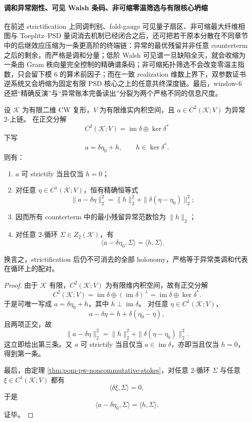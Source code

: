 \paragraph{调和异常刚性、可见 Walsh 条码、非可缩零温筛选与有限核心坍缩}
在前述 strictification 上同调判别、fold-gauge 可见量子扇区、非可缩最大纤维相图与 Toeplitz--PSD 量词消去机制已经闭合之后，还可把若干原本分散在不同章节中的后继效应压缩为一条更高阶的终端链：异常的最优残留并非任意 counterterm 之后的剩余，而严格是调和分量；低阶 Walsh 可见谱一旦缺陷全灭，就会收缩为一条由 Gram 秩向量完全控制的精确谱条码；非可缩拓扑筛选不会改变零温主指数，只会留下模 \(6\) 的算术前因子；而在一致 realization 维数上界下，双参数证书逆系统又会坍缩为固定有限 PSD 核心之上的任意共终深度链。最后，window-\(6\) 还把“精确反演”与“异常账本完备读出”分裂为两个严格不同的信息尺度。

\begin{theorem}\label{thm:conclusion-anomaly-harmonic-rigidity}
设 \(\mathcal K\) 为有限二维 CW 复形，\(V\) 为有限维实内积空间，且 \(a\in C^2(\mathcal K;V)\) 为异常 \(2\)-上链。
在正交分解
\[
C^2(\mathcal K;V)=\operatorname{im}\delta\oplus\ker\delta^\ast
\]
下写
\[
a=\delta\eta_0+h,
\qquad
h\in\ker\delta^\ast.
\]
则有：
\begin{enumerate}
  \item \(a\) 可 strictify 当且仅当 \(h=0\)；
  \item 对任意 \(\eta\in C^1(\mathcal K;V)\)，恒有精确恒等式
  \[
  \|a-\delta\eta\|_2^2
  =
  \|h\|_2^2+\|\delta(\eta-\eta_0)\|_2^2;
  \]
  \item 因而所有 counterterm 中的最小残留异常范数恰为 \(\|h\|_2\)；
  \item 对任意 \(2\)-循环 \(\Sigma\in Z_2(\mathcal K)\)，有
  \[
  \langle a-\delta\eta_0,\Sigma\rangle
  =
  \langle h,\Sigma\rangle.
  \]
\end{enumerate}
换言之，strictification 后仍不可消去的全部 holonomy，严格等于异常类调和代表在循环上的配对。
\end{theorem}
\begin{proof}
由于 \(\mathcal K\) 有限，\(C^2(\mathcal K;V)\) 为有限维内积空间，故有正交分解
\[
C^2(\mathcal K;V)=\operatorname{im}\delta\oplus(\operatorname{im}\delta)^\perp
=\operatorname{im}\delta\oplus\ker\delta^\ast.
\]
于是可唯一写成 \(a=\delta\eta_0+h\)，其中 \(h\perp\operatorname{im}\delta\)。
对任意 \(\eta\in C^1(\mathcal K;V)\)，
\[
a-\delta\eta
=
h+\delta(\eta_0-\eta),
\]
且两项正交，故
\[
\|a-\delta\eta\|_2^2
=
\|h\|_2^2+\|\delta(\eta-\eta_0)\|_2^2.
\]
这立即给出第三条。又 \(a\) 可 strictify 当且仅当 \(a\in\operatorname{im}\delta\)，亦即当且仅当 \(h=0\)，得到第一条。

最后，由定理 \ref{thm:pom-pw-noncommutative-stokes}，对任意 \(2\)-循环 \(\Sigma\) 与任意 \(\xi\in C^1(\mathcal K;V)\) 都有
\[
\langle \delta\xi,\Sigma\rangle=0,
\]
于是
\[
\langle a-\delta\eta_0,\Sigma\rangle
=
\langle h,\Sigma\rangle.
\]
证毕。
\end{proof}

